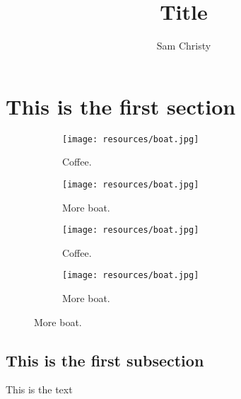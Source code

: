 \documentclass{article}
\title{Title}
\author{Sam Christy}
\begin{document}
\maketitle
\section{This is the first section}

\begin{figure}[h!]
  \centering
  \begin{subfigure}[b]{0.45\linewidth}
    \texttt{[image: resources/boat.jpg]}
     \caption{Coffee.}
  \end{subfigure}
  \begin{subfigure}[b]{0.45\linewidth}
    \texttt{[image: resources/boat.jpg]}
    \caption{More boat.}
  \end{subfigure}

  \begin{subfigure}[b]{0.45\linewidth}
    \texttt{[image: resources/boat.jpg]}
     \caption{Coffee.}
  \end{subfigure}
  \begin{subfigure}[b]{0.45\linewidth}
    \texttt{[image: resources/boat.jpg]}
    \caption{More boat.}
  \end{subfigure}
\end{figure}

\subsection{This is the first subsection}
This is the text
\end{document}
